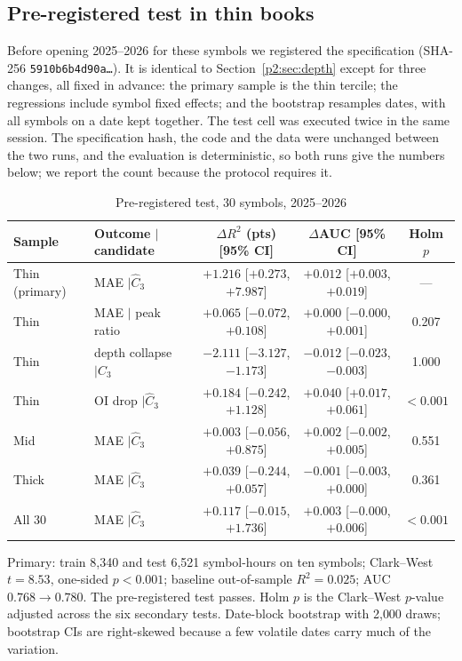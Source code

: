 \subsection{Pre-registered test in thin books}\label{p2:sec:x6}
Before opening 2025--2026 for these symbols we registered the specification (SHA-256 \texttt{5910b6b4d90a\ldots}). It is identical to Section~\ref{p2:sec:depth} except for three changes, all fixed in advance: the primary sample is the thin tercile; the regressions include symbol fixed effects; and the bootstrap resamples dates, with all symbols on a date kept together. The test cell was executed twice in the same session. The specification hash, the code and the data were unchanged between the two runs, and the evaluation is deterministic, so both runs give the numbers below; we report the count because the protocol requires it.

\begin{table}[t]\centering
\begin{threeparttable}
\caption{Pre-registered test, 30 symbols, 2025--2026}\label{p2:tab:x6}
\small\setlength{\tabcolsep}{4pt}
\begin{tabular}{llccc}
\toprule
Sample & Outcome $\mid$ candidate & $\Delta R^2$ (pts) [95\% CI] & $\Delta$AUC [95\% CI] & Holm $p$\\
\midrule
Thin (primary) & MAE $\mid\hat C_3$ & $+1.216$ [$+0.273$, $+7.987$] & $+0.012$ [$+0.003$, $+0.019$] & ---\\
Thin & MAE $\mid$ peak ratio & $+0.065$ [$-0.072$, $+0.108$] & $+0.000$ [$-0.000$, $+0.001$] & 0.207\\
Thin & depth collapse $\mid\hat C_3$ & $-2.111$ [$-3.127$, $-1.173$] & $-0.012$ [$-0.023$, $-0.003$] & 1.000\\
Thin & OI drop $\mid\hat C_3$ & $+0.184$ [$-0.242$, $+1.128$] & $+0.040$ [$+0.017$, $+0.061$] & $<0.001$\\
Mid & MAE $\mid\hat C_3$ & $+0.003$ [$-0.056$, $+0.875$] & $+0.002$ [$-0.002$, $+0.005$] & 0.551\\
Thick & MAE $\mid\hat C_3$ & $+0.039$ [$-0.244$, $+0.057$] & $-0.001$ [$-0.003$, $+0.000$] & 0.361\\
All 30 & MAE $\mid\hat C_3$ & $+0.117$ [$-0.015$, $+1.736$] & $+0.003$ [$-0.000$, $+0.006$] & $<0.001$\\
\bottomrule
\end{tabular}
\begin{tablenotes}\footnotesize\item Primary: train 8{,}340 and test 6{,}521 symbol-hours on ten symbols; Clark--West $t=8.53$, one-sided $p<0.001$; baseline out-of-sample $R^2=0.025$; AUC $0.768\to0.780$. The pre-registered test passes. Holm $p$ is the Clark--West $p$-value adjusted across the six secondary tests. Date-block bootstrap with 2{,}000 draws; bootstrap CIs are right-skewed because a few volatile dates carry much of the variation. \end{tablenotes}
\end{threeparttable}
\end{table}

